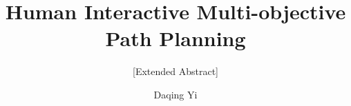 \documentclass{acm_proc_article-sp}
\begin{document}
\title{Human Interactive Multi-objective Path Planning}
\subtitle{[Extended Abstract]
}

\author{
\alignauthor
Daqing Yi \\%
       \\
       \\
}

\date{}

\maketitle
\begin{abstract}
\end{abstract}

\begin{comment}
Extended abstract — an anonymized, two-page description of the applicant's past, current, or proposed work (templates available) covering:
(1)the key research questions/motivation of the applicant's work,
(2)background and related work that informs the research,
(3)the research approach and methodology, and
(4)results to date (if any) and a description of remaining work.
\end{comment}
\end{document}
